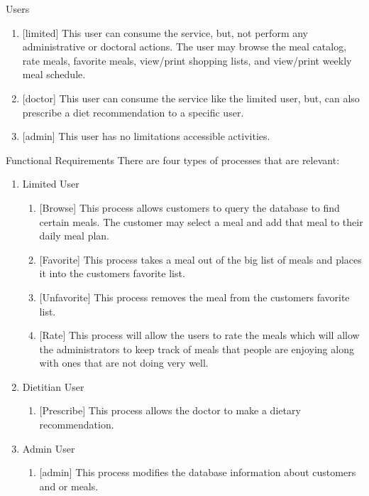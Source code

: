 \documentclass[a4paper,10pt,toc=graduated]{article}
\begin{document}
\begin{mySubsection}{Users}
\renewcommand{\labelenumi}{}
\renewcommand{\labelenumii}{}
\begin{enumerate}
\item {[limited]}
This user can consume the service, but, not perform any administrative or doctoral actions. The user may browse the meal catalog, rate meals, favorite meals, view/print shopping lists, and view/print weekly meal schedule.

\item {[doctor]}
This user can consume the service like the limited user, but, can also prescribe a diet recommendation to a specific user.

\item {[admin]}
This user has no limitations accessible activities.
\end{enumerate}
\end{mySubsection}
\begin{mySubsection}{Functional Requirements}
There are four types of processes that are relevant:
\renewcommand{\labelenumi}{}
\renewcommand{\labelenumii}{}
\begin{enumerate}
\item
Limited User
\begin{enumerate}
\item {[Browse]}
This process allows customers to query the database to find certain meals. The customer may select a meal and add that meal to their daily meal plan.
\item {[Favorite]}
This process takes a meal out of the big list of meals and places it into the customers favorite list.
\item {[Unfavorite]}
This process removes the meal from the customers favorite list.
\item {[Rate]}
This process will allow the users to rate the meals which will allow the administrators to keep track of meals that people are enjoying along with ones that are not doing very well.
\end{enumerate}
\item Dietitian User
\begin{enumerate}
\item {[Prescribe]}
This process allows the doctor to make a dietary recommendation.
\end{enumerate}
\item
Admin User
\begin{enumerate}
\item {[admin]}
This process modifies the database information about customers and or meals.
\end{enumerate}
\end{enumerate}
\end{mySubsection}
\end{document}
